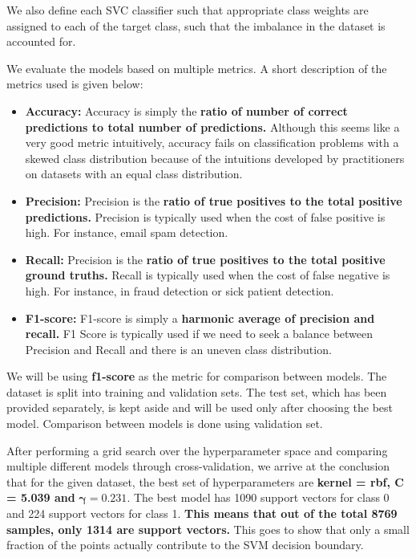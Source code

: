\documentclass[conference]{IEEEtran}
\begin{document}
We also define each SVC classifier such that appropriate class weights are assigned to each of the target class, such that the imbalance in the dataset is accounted for.

We evaluate the models based on multiple metrics. A short description of the metrics used is given below:

\begin{itemize}
    \item \textbf{Accuracy:}
    Accuracy is simply the \textbf{ratio of number of correct predictions to total number of predictions.} Although this seems like a very good metric intuitively, accuracy fails on classification problems with a skewed class distribution because of the intuitions developed by practitioners on datasets with an equal class distribution.
    \item \textbf{Precision:}
    Precision is the \textbf{ratio of true positives to the total positive predictions.} Precision is typically used when the cost of false positive is high. For instance, email spam detection.
    \item \textbf{Recall:}
    Precision is the \textbf{ratio of true positives to the total positive ground truths.} Recall is typically used when the cost of false negative is high. For instance, in fraud detection or sick patient detection.
    \item \textbf{F1-score:}
    F1-score is simply a \textbf{harmonic average of precision and recall.} F1 Score is typically used if we need to seek a balance between Precision and Recall and there is an uneven class distribution.
    
    
\end{itemize}


We will be using \textbf{f1-score} as the metric for comparison between models. The dataset is split into training and validation sets. The test set, which has been provided separately, is kept aside and will be used only after choosing the best model. Comparison between models is done using validation set.

After performing a grid search over the hyperparameter space and comparing multiple different models through cross-validation, we arrive at the conclusion that for the given dataset, the best set of hyperparameters are \textbf{kernel = rbf, C = 5.039 and }$\mathbf{\gamma = 0.231}$. The best model has 1090 support vectors for class 0 and 224 support vectors for class 1. \textbf{This means that out of the total 8769 samples, only 1314 are support vectors.} This goes to show that only a small fraction of the points actually contribute to the SVM decision boundary.
\end{document}
